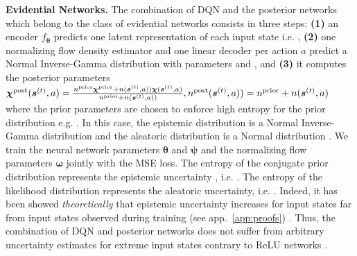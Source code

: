 \textbf{Evidential Networks.} The combination of DQN and the posterior networks \cite{natpn, postnet}  which belong to the class of evidential networks consists in three steps: \textbf{(1)} an encoder $ f_{\bm{\theta}}$ predicts one latent representation of each input state i.e. , \textbf{(2)} one normalizing flow density estimator  and one linear decoder  per action $a$ predict a Normal Inverse-Gamma distribution  with parameters  and , and \textbf{(3)} it computes the posterior parameters $\bm{\chi}^\text{post}(\bm{s}^{(t)}, a) = \frac{n^\text{prior}\bm{\chi}^\text{prior} + n(\bm{s}^{(t)}, a)) \bm{\chi}(\bm{s}^{(t)}, a)}{n^\text{prior} + n(\bm{s}^{(t)}, a))}, n^\text{post}(\bm{s}^{(t)}, a)) = n^\text{prior} + n(\bm{s}^{(t)}, a)$ where the prior parameters are chosen to enforce high entropy for the prior distribution e.g.  \cite{natpn}. In this case, the epistemic distribution is a Normal Inverse-Gamma distribution and the aleatoric distribution is a Normal distribution \cite{natpn}. We train the neural network parameters $\bm{\theta}$ and $\bm{\psi}$ and the normalizing flow parameters $\bm{\omega}$ jointly with the MSE loss. The entropy of the conjugate prior distribution represents the epistemic uncertainty , i.e. . The entropy of the likelihood distribution represents the aleatoric uncertainty, i.e. . Indeed, it has been showed \emph{theoretically} that epistemic uncertainty increases for input states far from input states observed during training (see app.~\ref{app:proofs}) \cite{natpn}. Thus, the combination of DQN and posterior networks does not suffer from arbitrary uncertainty estimates for extreme input states contrary to ReLU networks \cite{overconfident-relu}.
